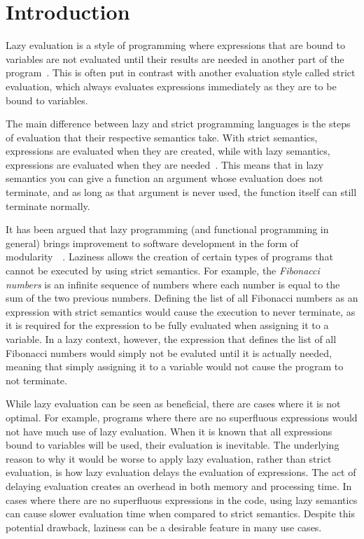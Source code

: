 \chapter{Introduction}
\label{chapter:intro}
Lazy evaluation is a style of programming where expressions that are bound to variables
are not evaluated until their results are needed in another part of the
program~\cite{Lazyeval6:online}. This is often put in contrast with another
evaluation style called strict evaluation, which always evaluates expressions
immediately as they are to be bound to variables. 

The main difference between lazy and strict programming languages is the steps
of evaluation that their respective semantics take. With strict semantics,
expressions are evaluated when they are created, while with lazy semantics,
expressions are evaluated when they are needed~\cite{ThunkHas27:online}.
This means that in lazy semantics you can give a function an argument
whose evaluation does not terminate, and as long as
that argument is never used, the function itself can still terminate normally.

It has been argued that lazy programming (and functional programming in general)
brings improvement to software development in the form of
modularity~\cite{Hu1989}~\cite{Hu2015}. Laziness allows the creation of certain
types of programs that cannot be executed by using strict semantics.
For example, the \textit{Fibonacci numbers} is an infinite sequence of numbers
where each number is equal to the sum of the two previous numbers.
Defining the list of all Fibonacci numbers as an expression with strict semantics would
cause the execution to never terminate, as it is required for the expression to be
fully evaluated when assigning it to a variable. In a lazy context, however,
the expression that defines the list of all Fibonacci numbers would simply not
be evaluted until it is actually needed, meaning that simply assigning it to a
variable would not cause the program to not terminate.

While lazy evaluation can be seen as beneficial, there are cases where it
is not optimal. For example, programs where there are
no superfluous expressions would not have much use of lazy evaluation. When it
is known that all expressions bound to variables will be used,
their evaluation is inevitable. The underlying reason to why it would be worse
to apply lazy evaluation, rather than strict evaluation, is how lazy evaluation
delays the evaluation of expressions. The act of delaying evaluation creates
an overhead in both memory and processing time.
In cases where there are no superfluous expressions in the code, using lazy
semantics can cause slower evaluation time when compared to
strict semantics. Despite this potential drawback, laziness can be a desirable
feature in many use cases. 

